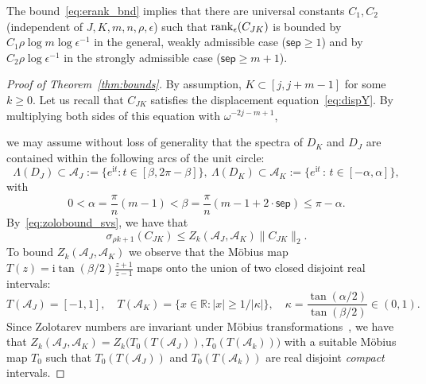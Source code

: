 \documentclass[final,reqno,onefignum,onetabnum]{siamart190516}
\newcommand{\sep}{\mathsf{sep}}
\newcommand{\erank}{{\rm rank}_\epsilon}
\newcommand{\iu}{\mathrm{i}}
\begin{document}
The bound~\eqref{eq:erank_bnd} implies that there are universal constants $C_1,C_2$ (independent of $J,K,m,n,\rho,\epsilon$)
such that $\erank(C_{JK})$ is bounded by $C_1 \rho \log m \log \epsilon^{-1}$ in the general, weakly admissible case ($\sep \ge 1$)
and by $C_2 \rho \log \epsilon^{-1}$ in the strongly admissible case ($\sep  \ge m + 1$).
\begin{proof}[Proof of Theorem~\ref{thm:bounds}]
By assumption, $K \subset [j,j\!+\!m\!-\!1]$ for some $k \ge 0$.
Let us recall that $C_{JK}$ satisfies the displacement equation~\eqref{eq:dispY}. By multiplying both sides of this equation with $\omega^{-2j-m+1}$,

we may assume without loss of generality that the spectra of $D_K$ and $D_J$ are contained within the following arcs of the unit circle:
\begin{equation*} %
 \Lambda(D_J) \subset \mathcal{A}_J := \{  e^{\iu t}: t \in [ \beta, 2 \pi \!- \!\beta]\},\ \Lambda(D_K) \subset \mathcal{A}_K := \{ e^{\iu t} \, :\, t \in [-\alpha, \alpha]\},
\end{equation*}
with 
\begin{equation} 
\label{eq:tau_kappa}
0 < \alpha = \frac{\pi}{n}(m\!-\!1) < \beta = \frac{\pi}{n}(m \!-\! 1\! + \!2 \cdot \sep) \leq \pi \!-\! \alpha.
\end{equation}
By~\eqref{eq:zolobound_svs}, we have that
\begin{equation} \label{eq:zolonew}
 \sigma_{\rho k + 1}(C_{JK}) \le Z_k(\mathcal{A}_J,\mathcal{A}_K) \|C_{JK}\|_2.
\end{equation}
To bound $Z_k( \mathcal{A}_J,\mathcal{A}_K)$ we observe that the M\"obius
map $T(z)= \mathrm i \tan(\beta/2) \frac{z+1}{z-1}$ maps  onto the union of two closed disjoint real intervals:
\[
T(\mathcal A_J) = [-1,1],\quad T(\mathcal A_K) = \big\{x\in \mathbb R\colon |x| \ge 1/|\kappa|\big\}, \quad \kappa = \frac{\tan(\alpha/2)}{\tan(\beta/2)} \in (0,1).
\]
Since Zolotarev numbers are invariant under M\"obius transformations~\cite{Beckermann2019}, we have that
$
 Z_k(\mathcal{A}_J, \mathcal{A}_K) = Z_k\big(T_0(T(\mathcal A_J)),T_0(T(\mathcal A_k))\big)$ with a suitable M\"obius map $T_0$ such that $T_0(T(\mathcal A_J))$ and $T_0(T(\mathcal A_k))$ are real disjoint \emph{compact} intervals.


\end{proof}
\end{document}
